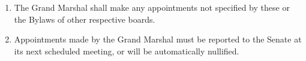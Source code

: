 \begin{enumerate}
    \item The Grand Marshal shall make any appointments not specified by these or the Bylaws of other respective boards.
    \item Appointments made by the Grand Marshal must be reported to the Senate at its next scheduled meeting, or will be automatically nullified.
\end{enumerate}
